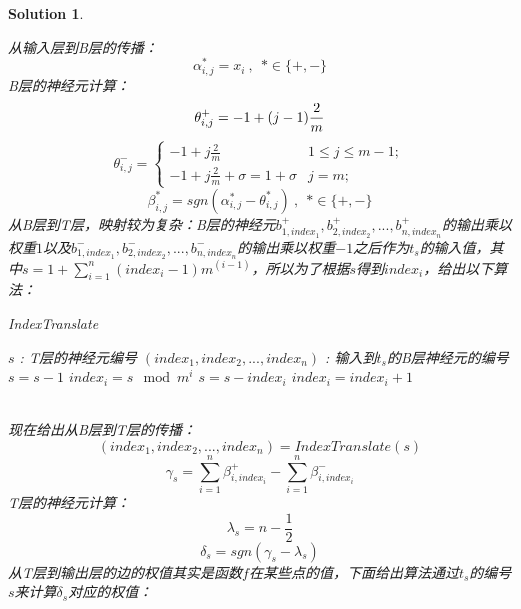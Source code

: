 \documentclass[a4paper,UTF8]{article}
\numberwithin{equation}{section}
\newtheorem*{solution}{Solution}
\begin{document}
\begin{solution}
\begin{enumerate}[ {(}1{)}]
从输入层到B层的传播：
\begin{equation}
\alpha_{i,j}^* = x_i\ ,\ \ *\in \{+,-\}
\end{equation}
B层的神经元计算：
\begin{equation}
\theta_{i,j}^+ = -1 + (j-1)\frac{2}{m}\\
\end{equation}
\begin{equation}
\theta_{i,j}^- =
\begin{cases}
-1 + j\frac{2}{m} & 1\leq j\leq m-1;\\
-1 + j\frac{2}{m} + \sigma = 1 + \sigma & j = m;
\end{cases}
\end{equation}
\begin{equation}
\beta_{i,j}^* = sgn(\alpha_{i,j}^* - \theta_{i,j}^*)\ ,\ \ *\in \{+, -\}
\end{equation}
从B层到T层，映射较为复杂：B层的神经元$b_{1, index_1}^+,b_{2,index_2}^+,...,b_{n,index_n}^+$的输出乘以权重$1$以及$b_{1, index_1}^-,b_{2,index_2}^-,...,b_{n,index_n}^-$的输出乘以权重$-1$之后作为$t_s$的输入值，其中$s= 1+\sum_{i=1}^{n}(index_i-1)m^{(i-1)} $，所以为了根据$s$得到$index_i$，给出以下算法：
\begin{algorithm}[h]  
	\caption{IndexTranslate}  
	\begin{algorithmic}[1]  
		\Require  
		$s$ : T层的神经元编号 
		\Ensure  
		$(index_1,index_2,...,index_n)$ : 输入到$t_s$的B层神经元的编号
		\State $s = s-1$ 
		\State $index_i = s \mod m^i$
		\State $s = s - index_i$
		\State $index_i = index_i + 1$
		\EndFor
		\label{code:recentEnd}  
	\end{algorithmic}  
\end{algorithm}\\
现在给出从B层到T层的传播：
\begin{equation}
(index_1, index_2,...,index_n) = IndexTranslate(s)
\end{equation}
\begin{equation}
\gamma_s = \sum_{i=1}^{n}\beta_{i,index_i}^+ - \sum_{i=1}^{n}\beta_{i,index_i}^-
\end{equation}
T层的神经元计算：\\
\begin{equation}
\lambda_s = n - \frac{1}{2}
\end{equation}
\begin{equation}
\delta_s = sgn(\gamma_s - \lambda_s)
\end{equation}
从T层到输出层的边的权值其实是函数$f$在某些点的值，下面给出算法通过$t_s$的编号$s$来计算$\delta_s$对应的权值：

\end{enumerate}
\end{solution}
\end{document}

